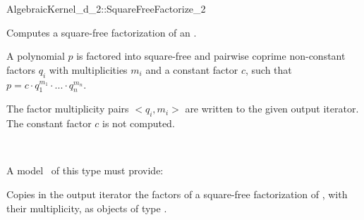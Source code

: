 \begin{ccRefFunctionObjectConcept}{AlgebraicKernel_d_2::SquareFreeFactorize_2}

\ccDefinition
Computes a square-free factorization of an
.

A polynomial $p$ is factored into square-free and pairwise 
coprime non-constant factors $q_i$ with multiplicities $m_i$ 
and a constant factor $c$, such that 
$p = c  \cdot  q_1^{m_1}  \cdot  ...  \cdot  q_n^{m_n}$.

The factor multiplicity pairs $<q_i,m_i>$ are written to the 
given output iterator. The constant factor $c$ is not computed. 

\ccRefines 
{}\\

\ccOperations
{}

A model \ccVar\ of this type must provide:

{Copies in the output iterator the factors of a square-free 
factorization of , with their multiplicity, as objects of type 
.}

\ccSeeAlso
{}\\
\\

\end{ccRefFunctionObjectConcept}
